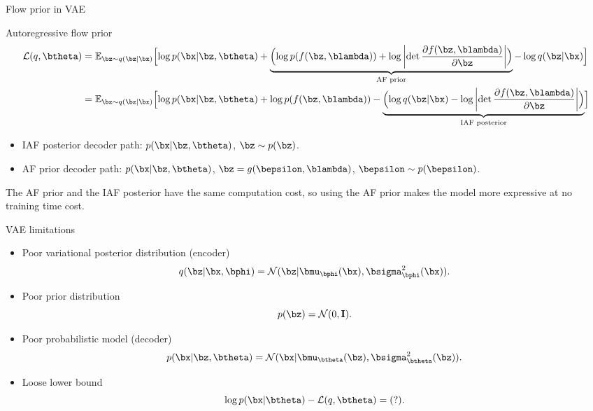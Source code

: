 \begin{frame}{Flow prior in VAE}
	\begin{block}{Autoregressive flow prior}
		{\footnotesize
		\begin{align*}
			\mathcal{L}(q, \btheta) &= \mathbb{E}_{\bz \sim q(\bz | \bx)} \Bigl[ \log p(\bx | \bz, \btheta) + \underbrace{ \Bigl( \log p(f(\bz, \blambda)) + \log \left| \det \frac{\partial f(\bz, \blambda)}{\partial \bz} \right| \Bigr) }_{\text{AF prior}} - \log q(\bz | \bx) \Bigr] \\
			&= \mathbb{E}_{\bz \sim q(\bz | \bx)} \Bigl[ \log p(\bx | \bz, \btheta) +  \log p(f(\bz, \blambda)) - \underbrace{ \Bigl( \log q(\bz | \bx) - \log \left| \det \frac{\partial f(\bz, \blambda)}{\partial \bz} \right| \Bigr) }_{\text{IAF posterior}} \Bigr]
		\end{align*}
		}
	\end{block}
	\begin{itemize}
		\item IAF posterior decoder path: $p(\bx|\bz, \btheta)$, $\bz \sim p(\bz)$.
		\item AF prior decoder path: $p(\bx|\bz, \btheta)$, $\bz = g(\bepsilon, \blambda)$, $\bepsilon \sim p(\bepsilon)$. 
	\end{itemize}
	The AF prior and the IAF posterior have the same computation cost, so using the AF prior makes the model more expressive at no training time cost.

\end{frame}
\begin{frame}{VAE limitations}
\begin{itemize}
	\item Poor variational posterior distribution (encoder)
	\[
	q(\bz | \bx, \bphi) = \mathcal{N}(\bz| \bmu_{\bphi}(\bx), \bsigma^2_{\bphi}(\bx)).
	\]
	\item Poor prior distribution
	\[
	p(\bz) = \mathcal{N}(0, \mathbf{I}).
	\]
	\item Poor probabilistic model (decoder)
	\[
	p(\bx | \bz, \btheta) = \mathcal{N}(\bx| \bmu_{\btheta}(\bz), \bsigma^2_{\btheta}(\bz)).
	\]
	\item Loose lower bound
	\[
	\log p(\bx | \btheta) - \mathcal{L}(q, \btheta) = (?).
	\]
\end{itemize}
\end{frame}
